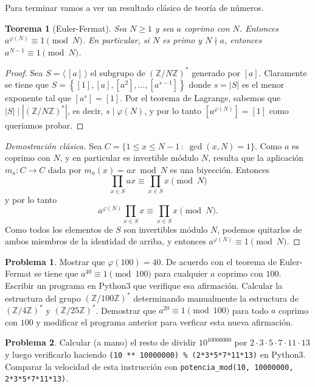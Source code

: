 \documentclass[a4paper, 11pt]{article}
\newcommand{\ZZ}{\mathbb{Z}}
\newcounter{numerodetema}
\theoremstyle{plain}
\newtheorem{teor}{Teorema}[numerodetema]
\theoremstyle{definition}
\newtheorem{prob}{Problema}[numerodetema]
\begin{document}
Para terminar vamos a ver un resultado clásico de teoría de números.

\begin{teor}[Euler-Fermat]\label{teor-euler-fermat}
Sea $N\geq 1$ y sea $a$ coprimo con $N$. Entonces $a^{\varphi(N)}\equiv 1\pmod{N}$.
En particular, si $N$ es primo y $N\nmid a$, entonces $a^{N-1}\equiv 1\pmod{N}$.
\end{teor}
\begin{proof}
Sea $S=\langle\,[a]\,\rangle$ el subgrupo de $(\ZZ/N\ZZ)^*$ generado por $[a]$.
Claramente se tiene que $S=\left\{[1],[a],[a^2],\ldots,[a^{s-1}]\right\}$ donde
$s=|S|$ es el menor exponente tal que $[a^s]=[1]$. Por el teorema de Lagrange,
sabemos que $|S|\mid|(\ZZ/N\ZZ)^*|$, es decir, $s\mid\varphi(N)$, y por lo tanto
$[a^{\varphi(N)}]=[1]$ como queriamos probar.
\end{proof}
\begin{proof}[Demostración clásica]
Sea $C=\{1\leq x\leq N-1\,:\;\gcd(x,N)=1\}$. Como $a$ es coprimo con $N$, y en
particular es invertible módulo $N$, resulta que la aplicación $m_a:C\to C$
dada por $m_a(x)=ax\bmod N$ es una biyección. Entonces
\[
\prod_{x\in S}ax\equiv\prod_{x\in S}x\pmod{N}
\]
y por lo tanto
\[
a^{\varphi(N)}\prod_{x\in S}x\equiv\prod_{x\in S}x\pmod{N}.
\]
Como todos los elementos de $S$ son invertibles módulo $N$, podemos quitarlos
de ambos miembros de la identidad de arriba, y entonces $a^{\varphi(N)}\equiv 1
\pmod{N}$.
\end{proof}

\begin{prob}
Mostrar que $\varphi(100)=40$. De acuerdo con el teorema de Euler-Fermat
se tiene que $a^{40}\equiv 1\pmod{100}$ para cualquier $a$ coprimo con $100$.
Escribir un programa en Python3 que verifique esa afirmación.
Calcular la estructura del grupo $(\ZZ/100\ZZ)^*$ determinando manualmente
la estructura de $(\ZZ/4\ZZ)^*$ y $(\ZZ/25\ZZ)^*$. Demostrar que $a^{20}\equiv 1
\pmod{100}$ para todo $a$ coprimo con $100$ y modificar el programa anterior
para verficar esta nueva afirmación.
\end{prob}

\begin{prob}
Calcular (a mano) el resto de dividir $10^{10000000}$ por
$2\cdot3\cdot5\cdot7\cdot11\cdot 13$ y luego verificarlo haciendo
\texttt{(10 ** 10000000) \% (2*3*5*7*11*13)} en Python3. Comparar
la velocidad de esta instrucción con
\texttt{potencia\_mod(10, 10000000, 2*3*5*7*11*13)}.
\end{prob}
\end{document}
